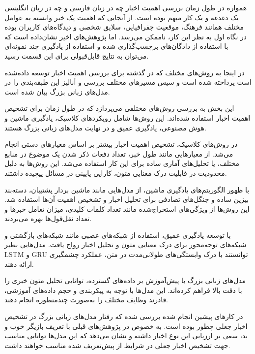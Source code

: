 
همواره در طول زمان بررسی اهمیت اخبار چه در زبان فارسی و چه در زبان انگلیسی یک دغدغه و یک کار مبهم بوده است. از آنجایی که اهمیت یک خبر وابسته به عوامل مختلف همانند فرهنگ، موقعیت جفرافیایی، سلایق شخصی و دیدگاه‌های کاربران بوده در نگاه اول به نظر این کار، ناممکن می‌رسد. اما پژوهش‌های اخیر نشان‌داده است که با استفاده از دادگان‌های برچسب‌گذاری شده و استفاده از یادگیری چند نمونه‌ای می‌توان به نتایج قابل‌قبولی برای این قسمت رسید.

در اینجا به روش‌های مختلف که در گذشته برای بررسی اهمیت اخبار توسعه‌ داده‌شده است پرداخته شده است و سپس مسیر‌های مختلف بررسی و آنالیز این طبقه‌بندی را در مدل‌های زبانی‌ بزرگ بیان شده است.

این بخش به بررسی روش‌های مختلفی می‌پردازد که در طول زمان برای تشخیص اهمیت اخبار استفاده شده‌اند. این روش‌ها شامل رویکردهای کلاسیک، یادگیری ماشین و هوش مصنوعی، یادگیری عمیق و در نهایت مدل‌های زبانی بزرگ هستند.

در روش‌های کلاسیک، تشخیص اهمیت اخبار بیشتر بر اساس معیارهای دستی انجام می‌شد. از معیارهایی مانند طول خبر، تعداد دفعات ذکر شدن یک موضوع در منابع مختلف، یا تحلیل‌های آماری ساده برای این کار استفاده می‌شد.
این روش‌ها به دلیل محدودیت در قابلیت درک معنایی متون، کارایی پایینی در مسائل پیچیده داشتند.

با ظهور الگوریتم‌های یادگیری ماشین، از مدل‌هایی مانند ماشین بردار پشتیبان، دسته‌بند بیزین ساده و جنگل‌های تصادفی
برای تحلیل اخبار و تشخیص اهمیت آن‌ها استفاده شد.
این روش‌ها از ویژگی‌های استخراج‌شده مانند تعداد کلمات کلیدی، میزان تعامل خبرها و تعداد نقل‌قول‌ها بهره می‌بردند.

با توسعه یادگیری عمیق، استفاده از شبکه‌های عصبی مانند شبکه‌های بازگشتی و شبکه‌های توجه‌محور برای درک معنایی متون و تحلیل اخبار رواج یافت. مدل‌هایی نظیر LSTM و GRU توانستند با درک وابستگی‌های طولانی‌مدت در متن، عملکرد چشمگیری ارائه دهند.

مدل‌های زبانی بزرگ با پیش‌آموزش بر داده‌های گسترده، توانایی تحلیل متون خبری را با دقت بالا فراهم کرده‌اند.
این مدل‌ها با توجه به پیکربندی و حجم داده‌های آموزشی، قادرند وظایف مختلف را به‌صورت چندمنظوره انجام دهند.

در کارهای پیشین انجام شده بررسی شده که رفتار مدل‌های زبانی بزرگ در تشخیص اخبار جعلی چطور بوده است. به خصوص در پژوهش‌های قبلی
با تعریف بازیگر خوب و بد، سعی بر ارزیابی این نوع اخبار داشته و نشان می‌دهد که این مدل‌ها توانایی مناسب جهت تشخیص اخبار جعلی در شرایط از پیش‌تعریف شده مناسب خواهند داشت.

